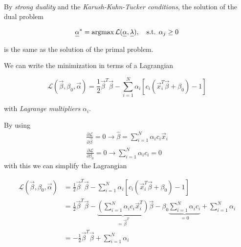 By \textit{strong duality} and the \textit{Karush-Kuhn-Tucker conditions}, the solution of the dual problem

\begin{equation}
    \vec{\alpha}^* = \argmax \mathcal{L}(\vec{\alpha}, \vec{\lambda}), \quad \text{s.t. } \alpha_j \geq 0
\end{equation}

is the same as the solution of the primal problem.


We can write the minimization in terms of a Lagrangian

\begin{equation}
    \mathcal{L}(\vec{\beta}, \beta_0, \vec{\alpha}) = \frac{1}{2} \vec{\beta}^T \vec{\beta} - \sum_{i=1}^N \alpha_i \left[ c_i \left( \vec{x}_i^T \vec{\beta} + \beta_0 \right) - 1 \right]
\end{equation}

with \textit{Lagrange multipliers} $\alpha_i$.

By using
\begin{equation}
    \begin{gathered}
    \frac{\partial \mathcal{L}}{\partial \vec{\beta}}=0 \rightarrow \hat{\beta}=\sum_{i=1}^N \alpha_i c_i \vec{x}_i \\
    \frac{\partial \mathcal{L}}{\partial \beta_0}=0 \rightarrow \sum_{i=1}^N \alpha_i c_i=0
    \end{gathered}
\end{equation}
with this we can simplify the Lagrangian

\begin{equation}
    \begin{aligned}
    \mathcal{L}(\vec{\beta}, \beta_0, \vec{\alpha}) &= \frac{1}{2} \vec{\beta}^T \vec{\beta} - \sum_{i=1}^N \alpha_i \left[ c_i \left( \vec{x}_i^T \vec{\beta} + \beta_0 \right) - 1 \right] \\
                                                    &= \frac{1}{2} \vec{\beta}^T \vec{\beta} - \underbrace{\left(\sum_{i=1}^N \alpha_i c_i \vec{x}_i^T\right)}_{=\vec{\beta}^T} \vec{\beta} - \beta_0 \underbrace{\sum_{i=1}^N \alpha_i c_i}_{=0} + \sum_{i=1}^N \alpha_i  \\
                                                    &= - \frac{1}{2} \vec{\beta}^T \vec{\beta} + \sum_{i=1}^N \alpha_i
    \end{aligned}
\end{equation}

